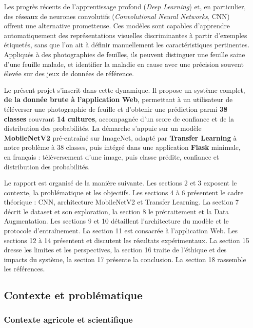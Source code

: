 \documentclass[10pt,a4paper]{article}
\begin{document}
Les progrès récents de l'apprentissage profond (\emph{Deep Learning}) et, en particulier, des réseaux de neurones convolutifs (\emph{Convolutional Neural Networks}, CNN) offrent une alternative prometteuse. Ces modèles sont capables d'apprendre automatiquement des représentations visuelles discriminantes à partir d'exemples étiquetés, sans que l'on ait à définir manuellement les caractéristiques pertinentes. Appliqués à des photographies de feuilles, ils peuvent distinguer une feuille saine d'une feuille malade, et identifier la maladie en cause avec une précision souvent élevée sur des jeux de données de référence.

Le présent projet s'inscrit dans cette dynamique. Il propose un système complet, \textbf{de la donnée brute à l'application Web}, permettant à un utilisateur de téléverser une photographie de feuille et d'obtenir une prédiction parmi \textbf{38 classes} couvrant \textbf{14 cultures}, accompagnée d'un score de confiance et de la distribution des probabilités. La démarche s'appuie sur un modèle \textbf{MobileNetV2} pré-entraîné sur ImageNet, adapté par \textbf{Transfer Learning} à notre problème à 38 classes, puis intégré dans une application \textbf{Flask} minimale, en français : téléversement d'une image, puis classe prédite, confiance et distribution des probabilités.

Le rapport est organisé de la manière suivante. Les sections 2 et 3 exposent le contexte, la problématique et les objectifs. Les sections 4 à 6 présentent le cadre théorique : CNN, architecture MobileNetV2 et Transfer Learning. La section 7 décrit le dataset et son exploration, la section 8 le prétraitement et la Data Augmentation. Les sections 9 et 10 détaillent l'architecture du modèle et le protocole d'entraînement. La section 11 est consacrée à l'application Web. Les sections 12 à 14 présentent et discutent les résultats expérimentaux. La section 15 dresse les limites et les perspectives, la section 16 traite de l'éthique et des impacts du système, la section 17 présente la conclusion. La section 18 rassemble les références.

\subsection{Contexte et problématique}

\subsubsection{Contexte agricole et scientifique}
\end{document}
